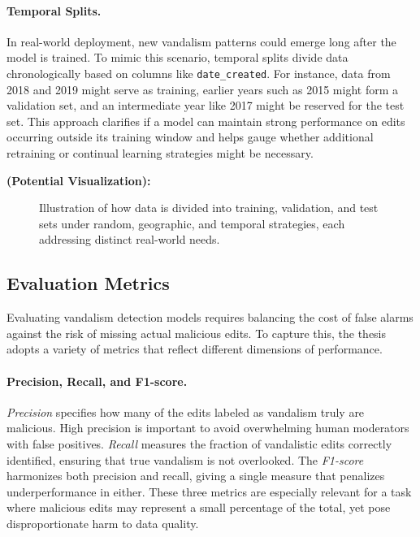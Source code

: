 \documentclass[
    13pt, %
    a4paper, %
    twoside, 
    DIV14, %
    listof=totoc, %
    bibliography=totoc, %
    index=totoc, %
    headsepline
]{scrreprt}
\begin{document}
\paragraph{Temporal Splits.}
In real-world deployment, new vandalism patterns could emerge long after the model is trained. To mimic this scenario, temporal splits divide data chronologically based on columns like \texttt{date\_created}. For instance, data from 2018 and 2019 might serve as training, earlier years such as 2015 might form a validation set, and an intermediate year like 2017 might be reserved for the test set. This approach clarifies if a model can maintain strong performance on edits occurring outside its training window and helps gauge whether additional retraining or continual learning strategies might be necessary.

\noindent
\textbf{(Potential Visualization):}  
\begin{figure}[htbp]
    \centering
    \caption{Illustration of how data is divided into training, validation, and test sets under random, geographic, and temporal strategies, each addressing distinct real-world needs.}
    \label{fig:data_splitting_flowchart}
\end{figure}

\subsection{Evaluation Metrics}
\label{sec:evaluation_metrics}

Evaluating vandalism detection models requires balancing the cost of false alarms against the risk of missing actual malicious edits. To capture this, the thesis adopts a variety of metrics that reflect different dimensions of performance.

\paragraph{Precision, Recall, and F1-score.}
\emph{Precision} specifies how many of the edits labeled as vandalism truly are malicious. High precision is important to avoid overwhelming human moderators with false positives. \emph{Recall} measures the fraction of vandalistic edits correctly identified, ensuring that true vandalism is not overlooked. The \emph{F1-score} harmonizes both precision and recall, giving a single measure that penalizes underperformance in either. These three metrics are especially relevant for a task where malicious edits may represent a small percentage of the total, yet pose disproportionate harm to data quality.
\end{document}
